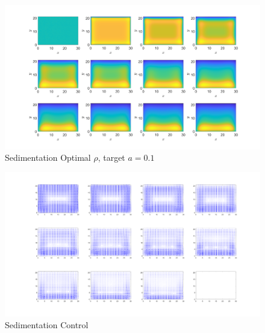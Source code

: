 \documentclass[11pt, a4paper]{article}
\theoremstyle{definition}
\begin{document}
\begin{figure}[h]
	\centering
	\includegraphics[scale=0.2]{Opt1.png}
	\caption{Sedimentation Optimal $\rho$, target $a =0.1$} 
	\label{F03}
\end{figure} 
\begin{figure}[h]
	\centering
	\includegraphics[scale=0.2]{C1.png}
	\caption{Sedimentation Control} 
	\label{F02}
\end{figure} 
\end{document}
